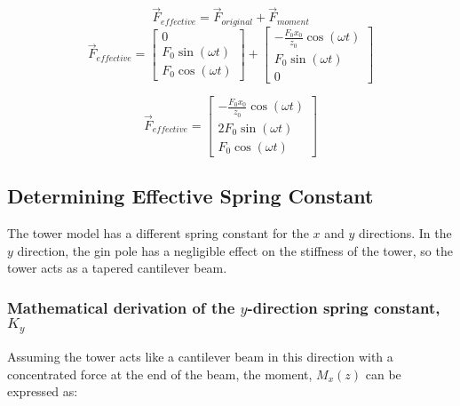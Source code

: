 \begin{equation}\label{eq:effective_force}
	\vec{F}_{effective} = \vec{F}_{original} + \vec{F}_{moment}
\end{equation}
$$ 
	\vec{F}_{effective} = 
	\begin{bmatrix}0\\F_{0} \sin{\left (\omega t \right )}\\F_{0} \cos{\left (\omega t \right )}\end{bmatrix}
	+ \begin{bmatrix}- \frac{F_{0} x_{0}}{z_{0}} \cos{\left (\omega t \right )}\\ F_{0} \sin{\left (\omega t \right )}\\ 0\end{bmatrix}
$$

\begin{equation}
	\vec{F}_{effective} = 
		\left[\begin{matrix}- \frac{F_{0} x_{0}}{z_{0}} \cos{\left (\omega t \right )}\\2 F_{0} \sin{\left (\omega t \right )}\\F_{0} \cos{\left (\omega t \right )}\end{matrix}\right]
\end{equation}

\subsection{Determining Effective Spring Constant}
The tower model has a different spring constant for the $x$ and $y$ directions.  In the $y$ direction, the gin pole has a negligible effect on the stiffness of the tower, so the tower acts as a tapered cantilever beam. 


\subsubsection{Mathematical derivation of the $y$-direction spring constant, $K_y$}
Assuming the tower acts like a cantilever beam in this direction with a concentrated force at the end of the beam, the moment, $M_x(z)$ can be expressed as:

